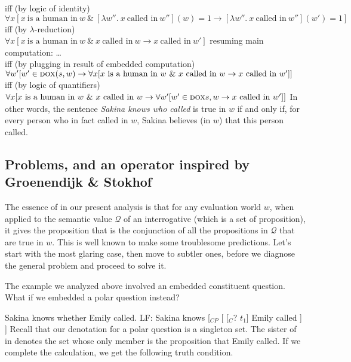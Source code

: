 {\small iff (by logic of identity)}\\
$\forall x [ x\ \text{is a human
  in}\ w\ \&\ [\lambda w''.\ x\ \text{called
  in}\ w''](w)=1 \rightarrow [\lambda w''.\ x\ \text{called in}\ w''](w')=1]$\\
{\small iff (by $\lambda$-reduction)}\\
$\forall x [ x\ \text{is a human in}\ w\ \&\ x\ \text{called
  in}\ w \rightarrow x\ \text{called in}\ w']$
\a resuming main computation:
\dots \\
{\small iff (by plugging in result of embedded computation)}\\
$\forall w' [w'\in \textsc{dox}(s,w) \rightarrow \forall x [ x\ \text{is a human in}\ w\ \&\ x\ \text{called
  in}\ w \rightarrow x\ \text{called in}\ w']]$\\
{\small iff (by logic of quantifiers)}\\
$\forall x [x\ \text{is a human in}\ w\ \&\ x\ \text{called
  in}\ w \rightarrow \forall w' [w'\in \dox{s,w} \rightarrow x\ \text{called
  in}\ w']]$
\xe
%
In other words, the sentence \emph{Sakina knows who called} is true in $w$ if
and only if, for every person who in fact called in $w$, Sakina believes (in
$w$) that this person called.

\subsection{Problems, and an \ans operator inspired by Groenendijk \& Stokhof}
\label{sec:ANS-GS}

The essence of \ans in our present analysis is that for any evaluation world
$w$, when applied to the semantic value $\mathcal{Q}$ of an interrogative (which
is a set of proposition), it gives the proposition that is the conjunction of
all the propositions in $\mathcal{Q}$ that are true in $w$. This is well known
to make some troublesome predictions. Let's start with the most glaring case,
then move to subtler ones, before we diagnose the general problem and proceed to
solve it.

The example we analyzed above involved an embedded constituent question. What if
we embedded a polar question instead?

\pex
\a Sakina knows whether Emily called.
\a LF: Sakina knows [$_{CP}$ [ [$_{C}$? $t_{1}$] Emily called ] ]
\xe
%
Recall that our denotation for a polar question is a singleton set. The sister
of \ans in \Last[b] denotes the set whose only member is the proposition that
Emily called. If we complete the calculation, we get the following truth
condition.


